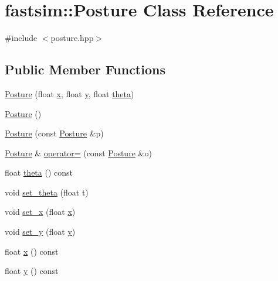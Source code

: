 \hypertarget{classfastsim_1_1_posture}{}\section{fastsim\+:\+:Posture Class Reference}
\label{classfastsim_1_1_posture}


{\ttfamily \#include $<$posture.\+hpp$>$}

\subsection*{Public Member Functions}
\begin{DoxyCompactItemize}
\item 
\hyperlink{classfastsim_1_1_posture_a73eef5693e32bad78f9506fe70f32aa4}{Posture} (float \hyperlink{classfastsim_1_1_posture_a1c425e41c372d755af560f33c0687a04}{x}, float \hyperlink{classfastsim_1_1_posture_adcda5bd483be5848fea3a384cb2b3b15}{y}, float \hyperlink{classfastsim_1_1_posture_a3b1341321c79dd22e0a912292e9b4e92}{theta})
\item 
\hyperlink{classfastsim_1_1_posture_acb9abf9c956bd42d76029533ea33c930}{Posture} ()
\item 
\hyperlink{classfastsim_1_1_posture_a52180fae898fb5db60776833c5ac0a0b}{Posture} (const \hyperlink{classfastsim_1_1_posture}{Posture} \&p)
\item 
\hyperlink{classfastsim_1_1_posture}{Posture} \& \hyperlink{classfastsim_1_1_posture_ac294304164dce23f66b60f51f04e8bcd}{operator=} (const \hyperlink{classfastsim_1_1_posture}{Posture} \&o)
\item 
float \hyperlink{classfastsim_1_1_posture_a3b1341321c79dd22e0a912292e9b4e92}{theta} () const 
\item 
void \hyperlink{classfastsim_1_1_posture_a112d24f474f0b2272cdfa86eb981c1c3}{set\+\_\+theta} (float t)
\item 
void \hyperlink{classfastsim_1_1_posture_a39eab8e728aab7bb3feaaabe80268b97}{set\+\_\+x} (float \hyperlink{classfastsim_1_1_posture_a1c425e41c372d755af560f33c0687a04}{x})
\item 
void \hyperlink{classfastsim_1_1_posture_a72f1ce8035d72b138470ece2b82e97a4}{set\+\_\+y} (float \hyperlink{classfastsim_1_1_posture_adcda5bd483be5848fea3a384cb2b3b15}{y})
\item 
float \hyperlink{classfastsim_1_1_posture_a1c425e41c372d755af560f33c0687a04}{x} () const 
\item 
float \hyperlink{classfastsim_1_1_posture_adcda5bd483be5848fea3a384cb2b3b15}{y} () const 

\end{DoxyCompactItemize}
